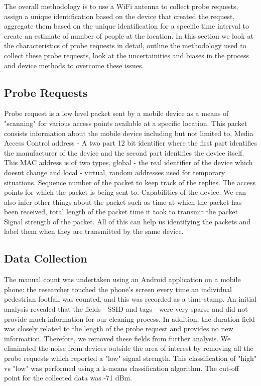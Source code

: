 The overall methodology is to use a WiFi antenna to collect probe requests,
assign a unique identification based on the device that created the request,
aggregate them based on the unique identification for a specific time interval
to create an estimate of number of people at the location.
In this section we look at the characteristics of probe requests in detail,
outline the methodology used to collect these probe requests, 
look at the uncertainities and biases in the process and 
device methods to overcome these issues.

\subsection{Probe Requests}
Probe request is a low level packet sent by a mobile device as a means of
"scanning" for various access points available at a specific location.
This packet consists information about the mobile device including but not 
limited to,
Media Access Control address - A two part 12 bit identifier where the first part
identifies the manufacturer of the device and the second part identifies the
device itself. This MAC address is of two types, global - the real identifier
of the device which doesnt change and local - virtual, random addresses used
for temporary situations.
Sequence number of the packet to keep track of the replies.
The access points for which the packet is being sent to.
Capabilities of the device.
We can also infer other things about the packet such as
time at which the packet has been received,
total length of the packet
time it took to transmit the packet
Signal strength of the packet.
All of this can help us identifying the packets and label them when they are transmitted by the same device.

\subsection{Data Collection}
The manual count was undertaken using an Android application on a mobile phone: the researcher touched the phone’s screen every time an individual pedestrian footfall was counted, and this was recorded as a time-stamp.
An initial analysis revealed that the fields - SSID and tags - were very sparse and did not provide much information for our cleaning process.
In addition, the duration field was closely related to the length of the probe request and provides no new information.
Therefore, we removed these fields from further analysis.
We eliminated the noise from devices outside the area of interest by removing all the probe requests which reported a "low" signal strength.
This classification of "high" vs "low" was performed using a k-means classification algorithm.
The cut-off point for the collected data was -71 dBm.
